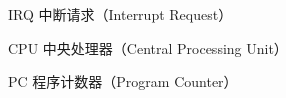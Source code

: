 \begin{denotation}

\item[IRQ] 中断请求（Interrupt Request）
\item[CPU] 中央处理器（Central Processing Unit）
\item[PC]  程序计数器（Program Counter）	

\end{denotation}
